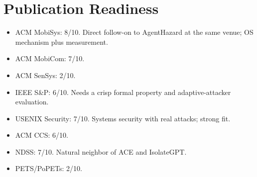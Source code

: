 \documentclass[11pt]{article}
\begin{document}
\section{Publication Readiness}
\begin{itemize}
  \item ACM MobiSys: 8/10. Direct follow-on to AgentHazard at the same venue; OS mechanism plus measurement.
  \item ACM MobiCom: 7/10.
  \item ACM SenSys: 2/10.
  \item IEEE S\&P: 6/10. Needs a crisp formal property and adaptive-attacker evaluation.
  \item USENIX Security: 7/10. Systems security with real attacks; strong fit.
  \item ACM CCS: 6/10.
  \item NDSS: 7/10. Natural neighbor of ACE and IsolateGPT.
  \item PETS/PoPETs: 2/10.
\end{itemize}
\end{document}
